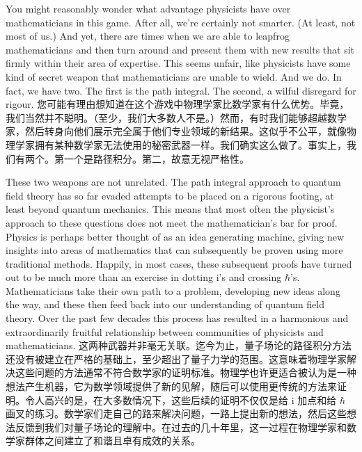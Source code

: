 \documentclass{article}
\begin{document}
You might reasonably wonder what advantage physicists have over mathematicians in this game. After all, we're certainly not smarter. (At least, not most of us.) And yet, there are times when we are able to leapfrog mathematicians and then turn around and present them with new results that sit firmly within their area of expertise. This seems unfair, like physicists have some kind of secret weapon that mathematicians are unable to wield. And we do. In fact, we have two. The first is the path integral. The second, a wilful disregard for rigour.
您可能有理由想知道在这个游戏中物理学家比数学家有什么优势。毕竟，我们当然并不聪明。（至少，我们大多数人不是。）然而，有时我们能够超越数学家，然后转身向他们展示完全属于他们专业领域的新结果。这似乎不公平，就像物理学家拥有某种数学家无法使用的秘密武器一样。我们确实这么做了。事实上，我们有两个。第一个是路径积分。第二，故意无视严格性。

These two weapons are not unrelated. The path integral approach to quantum field theory has so far evaded attempts to be placed on a rigorous footing, at least beyond quantum mechanics. This means that most often the physicist's approach to these questions does not meet the mathematician's bar for proof. Physics is perhaps better thought of as an idea generating machine, giving new insights into areas of mathematics that can subsequently be proven using more traditional methods. Happily, in most cases, these subsequent proofs have turned out to be much more than an exercise in dotting i's and crossing $\hbar$'s. Mathematicians take their own path to a problem, developing new ideas along the way, and these then feed back into our understanding of quantum field theory. Over the past few decades this process has resulted in a harmonious and extraordinarily fruitful relationship between communities of physicists and mathematicians.
这两种武器并非毫无关联。迄今为止，量子场论的路径积分方法还没有被建立在严格的基础上，至少超出了量子力学的范围。这意味着物理学家解决这些问题的方法通常不符合数学家的证明标准。物理学也许更适合被认为是一种想法产生机器，它为数学领域提供了新的见解，随后可以使用更传统的方法来证明。令人高兴的是，在大多数情况下，这些后续的证明不仅仅是给 i 加点和给 $\hbar$ 画叉的练习。数学家们走自己的路来解决问题，一路上提出新的想法，然后这些想法反馈到我们对量子场论的理解中。在过去的几十年里，这一过程在物理学家和数学家群体之间建立了和谐且卓有成效的关系。
\end{document}
